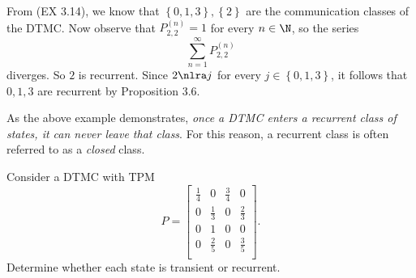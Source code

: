 \documentclass[stat333]{subfiles}
\begin{document}
    \begin{subproof}[Answer]
        From (EX 3.14), we know that $\left\lbrace 0,1,3 \right\rbrace, \left\lbrace 2 \right\rbrace$ are the communication classes of the DTMC. Now observe that $P^{\left( n \right)}_{2,2} = 1$ for every $n\in\N$, so the series
        \begin{equation*}
            \sum^{\infty}_{n=1}P^{\left( n \right)}_{2,2}
        \end{equation*}
        diverges. So $2$ is recurrent. Since $2\nlra j$ for every $j\in\left\lbrace 0,1,3 \right\rbrace$, it follows that $0,1,3$ are recurrent by Proposition 3.6.
    \end{subproof}

    \np As the above example demonstrates, \textit{once a DTMC enters a recurrent class of states, it can never leave that class}. For this reason, a recurrent class is often referred to as a \textit{closed} class.

    \ex Consider a DTMC with TPM
    \begin{equation*}
        P =
        \begin{bmatrix}
        	\frac{1}{4} & 0 & \frac{3}{4} & 0 \\
        	0 & \frac{1}{3} & 0 & \frac{2}{3} \\
        	0 & 1 & 0 & 0 \\
        	0 & \frac{2}{5} & 0 & \frac{3}{5} \\
        \end{bmatrix}.
    \end{equation*}
    Determine whether each state is transient or recurrent.
\end{document}
